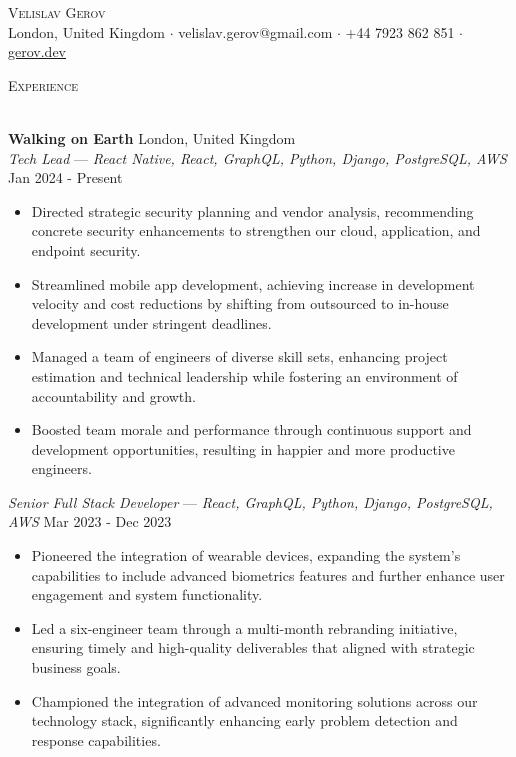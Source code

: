 \documentclass[a4paper]{article}
\newcommand{\lineunder} {
    \vspace*{-8pt} \\
    \hspace*{-18pt} \hrulefill \\
}
\newcommand{\header} [1] {
    {\hspace*{-18pt}\vspace*{6pt} \textsc{#1}}
    \vspace*{-6pt} \lineunder
}
\begin{document}
\vspace*{-40pt}



\vspace*{-10pt}
\begin{center}
    {\Huge \scshape {Velislav Gerov}}\\
    London, United Kingdom $\cdot$ velislav.gerov@gmail.com $\cdot$ +44 7923 862 851 $\cdot$  \href{https://gerov.dev}{\underline{gerov.dev}}\\
\end{center}

\header{Experience}
\vspace{1mm}

\textbf{Walking on Earth} \hfill London, United Kingdom\\
\textit{Tech Lead} — {\sl React Native, React, GraphQL, Python, Django, PostgreSQL, AWS} \hfill Jan 2024 - Present\\
\vspace{-1mm}
\begin{itemize} \itemsep 1pt
    \item Directed strategic security planning and vendor analysis, recommending concrete security enhancements to strengthen our cloud, application, and endpoint security.
    \item Streamlined mobile app development, achieving increase in development velocity and cost reductions by shifting from outsourced to in-house development under stringent deadlines.
    \item Managed a team of engineers of diverse skill sets, enhancing project estimation and technical leadership while fostering an environment of accountability and growth.
    \item  Boosted team morale and performance through continuous support and development opportunities, resulting in happier and more productive engineers.
\end{itemize}

\textit{Senior Full Stack Developer} — {\sl React, GraphQL, Python, Django, PostgreSQL, AWS} \hfill Mar 2023 - Dec 2023\\
\vspace{-1mm}
\begin{itemize} \itemsep 1pt
    \item Pioneered the integration of wearable devices, expanding the system's capabilities to include advanced biometrics features and further enhance user engagement and system functionality.
    \item Led a six-engineer team through a multi-month rebranding initiative, ensuring timely and high-quality deliverables that aligned with strategic business goals.
    \item Championed the integration of advanced monitoring solutions across our technology stack, significantly enhancing early problem detection and response capabilities.
\end{itemize}
\end{document}
